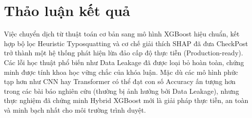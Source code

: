\section{Thảo luận kết quả}
Việc chuyển dịch từ thuật toán cơ bản sang mô hình XGBoost hiệu chuẩn, kết hợp bộ lọc Heuristic Typosquatting và cơ chế giải thích SHAP đã đưa CheckPost trở thành một hệ thống phát hiện lừa đảo cấp độ thực tiễn (Production-ready). Các lỗi học thuật phổ biến như Data Leakage đã được loại bỏ hoàn toàn, chứng minh được tính khoa học vững chắc của khóa luận. Mặc dù các mô hình phức tạp hơn như CNN hay Transformer có thể đạt con số Accuracy ấn tượng hơn trong các bài báo nghiên cứu (thường bị ảnh hưởng bởi Data Leakage), nhưng thực nghiệm đã chứng minh Hybrid XGBoost mới là giải pháp thực tiễn, an toàn và minh bạch nhất cho môi trường trình duyệt.